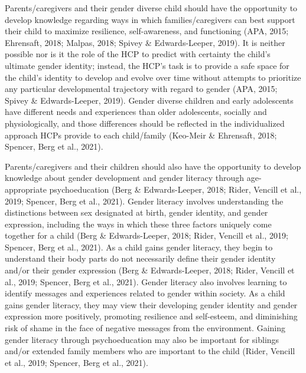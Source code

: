 \documentclass[
]{book}
\begin{document}
Parents/caregivers and their gender diverse child
should have the opportunity to develop knowledge
regarding ways in which families/caregivers can
best support their child to maximize resilience,
self-awareness, and functioning (APA, 2015;
Ehrensaft, 2018; Malpas, 2018; Spivey \&
Edwards-Leeper, 2019). It is neither possible nor
is it the role of the HCP to predict with certainty
the child's ultimate gender identity; instead, the
HCP's task is to provide a safe space for the child's
identity to develop and evolve over time without
attempts to prioritize any particular developmental
trajectory with regard to gender (APA, 2015;
Spivey \& Edwards-Leeper, 2019). Gender diverse
children and early adolescents have different needs
and experiences than older adolescents, socially
and physiologically, and those differences should
be reflected in the individualized approach HCPs
provide to each child/family (Keo-Meir \&
Ehrensaft, 2018; Spencer, Berg et al., 2021).

Parents/caregivers and their children should
also have the opportunity to develop knowledge
about gender development and gender literacy
through age-appropriate psychoeducation (Berg
\& Edwards-Leeper, 2018; Rider, Vencill et al.,
2019; Spencer, Berg et al., 2021). Gender literacy
involves understanding the distinctions between
sex designated at birth, gender identity, and gender expression, including the ways in which these
three factors uniquely come together for a child
(Berg \& Edwards-Leeper, 2018; Rider, Vencill
et al., 2019; Spencer, Berg et al., 2021). As a child
gains gender literacy, they begin to understand
their body parts do not necessarily define their
gender identity and/or their gender expression
(Berg \& Edwards-Leeper, 2018; Rider, Vencill
et al., 2019; Spencer, Berg et al., 2021). Gender
literacy also involves learning to identify messages
and experiences related to gender within society.
As a child gains gender literacy, they may view
their developing gender identity and gender
expression more positively, promoting resilience
and self-esteem, and diminishing risk of shame
in the face of negative messages from the environment. Gaining gender literacy through psychoeducation may also be important for siblings
and/or extended family members who are important to the child (Rider, Vencill et al., 2019;
Spencer, Berg et al., 2021).
\end{document}
